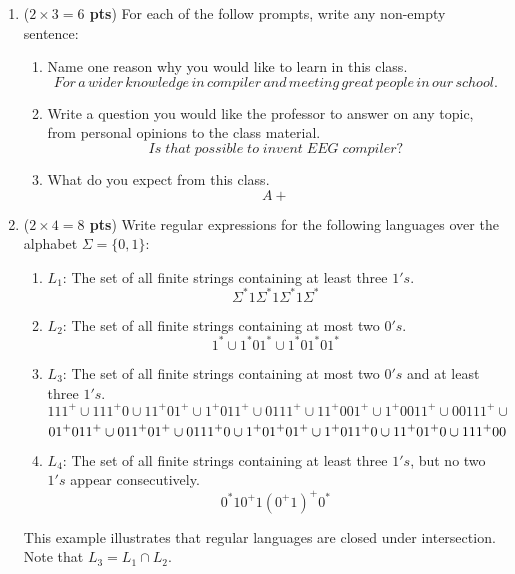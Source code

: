 \documentclass[10pt]{article}
\newcommand {\pts}[1]{({\bf #1 pts})}
\begin{document}
\begin{enumerate}
  \item \pts{$2\times 3=6$} For each of the follow prompts, write any non-empty sentence:
  \begin{enumerate}

           \item Name one reason why you would like to learn in this class.
            \[
            For\,a \,wider \,knowledge\, in\, compiler\, and\, meeting\, great\, people\, in\, our\, school.  \]
           \item Write a question you would like the professor to answer on any topic, from personal opinions to the class material.
            \[
            Is\; that\; possible\; to\; invent\; EEG\; compiler?
            \]
           \item What do you expect from this class.
            \[
            A+
            \]

  \end{enumerate}
  \item \pts{$2\times 4=8$} Write regular expressions for the following languages over the alphabet $\Sigma=\{0,1\}$:
 \begin{enumerate}
           \item $L_1$: The set of all finite strings containing at least three $1's$.
            \[
				\Sigma^*1\Sigma^*1\Sigma^*1\Sigma^*
            \]
           \item $L_2$: The set of all finite strings containing at most two $0's$.
            \[
				1^*\cup1^*01^*\cup1^*01^*01^*
            \]
           \item $L_3$: The set of all finite strings containing at most two $0's$ and at least three $1's$.
            \[
				111^+\cup111^+0\cup11^+01^+\cup1^+011^+\cup0111^+\cup11^+001^+\cup1^+0011^+\cup00111^+\cup     \]
            \[
            \\ 01^+011^+\cup011^+01^+\cup0111^+0\cup1^+01^+01^+\cup1^+011^+0\cup11^+01^+0\cup111^+00
            \]
           \item $L_4$: The set of all finite strings containing at least three $1's$, but no two $1's$ appear consecutively.
            \[
				0^*10^+1(0^+1)^+0^*
            \]
   \end{enumerate}
   This example illustrates that regular languages are closed under intersection. Note that
   $L_3=L_1\cap L_2$.


\end{enumerate}
\end{document}
